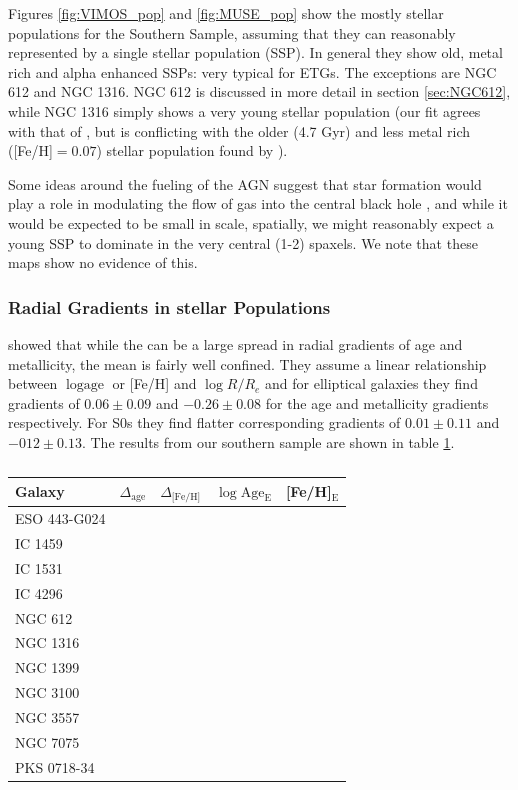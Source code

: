 		Figures \ref{fig:VIMOS_pop} and \ref{fig:MUSE_pop} show the mostly stellar populations for the Southern Sample, assuming that they can reasonably represented by a single stellar population (SSP). In general they show old, metal rich and alpha enhanced SSPs: very typical for ETGs. The exceptions are NGC 612 and NGC 1316. NGC 612 is discussed in more detail in section \ref{sec:NGC612}, while NGC 1316 simply shows a very young stellar population (our fit agrees with that of \citet{Kuntschner2000}, but is conflicting with the older (4.7 Gyr) and less metal rich ([Fe/H]$ = 0.07$) stellar population found by \citet{Koleva2011}). 

		Some ideas around the fueling of the AGN suggest that star formation would play a role in modulating the flow of gas into the central black hole \citep{}, and while it would be expected to be small in scale, spatially, we might reasonably expect a young SSP to dominate in the very central (1-2) spaxels. We note that these maps show no evidence of this. 


		\subsubsection{Radial Gradients in stellar Populations}
			\label{subsubsec:popGrad}

			\citet{Koleva2011} showed that while the can be a large spread in radial gradients of age and metallicity, the mean is fairly well confined. They assume a linear relationship between $\log \text{age}$ or [Fe/H] and $\log R/R_e$ and for elliptical galaxies they find gradients of $0.06\pm0.09$ and $-0.26\pm0.08$ for the age and metallicity gradients respectively. For S0s they find flatter corresponding gradients of $0.01\pm0.11$ and $-012\pm0.13$. The results from our southern sample are shown in table \ref{tab:popGrad}.

			\begin{table}
				\centering
				\caption{}
				\label{tab:popGrad}
				\begin{tabular}{l r r r r}
					\hline
					\hline
					Galaxy 	& $\Delta_\text{age}$ & $\Delta_\text{[Fe/H]}$ & $\log \mathrm{Age_E}$ & [Fe/H]$_\mathrm{E}$ \\
					\hline
					ESO 443-G024 &  &  &  &  \\
					IC 1459 	&  &  &  &  \\
					IC 1531 	&  &  &  &  \\
					IC 4296		&  &  &  &  \\
					NGC 612 	&  &  &  &  \\
					NGC 1316 	&  &  &  &  \\
					NGC 1399 	&  &  &  &  \\
					NGC 3100 	&  &  &  &  \\
					NGC 3557 	&  &  &  &  \\
					NGC 7075 	&  &  &  &  \\
					PKS 0718-34 &  &  &  &  \\
				\end{tabular}
			\end{table}



